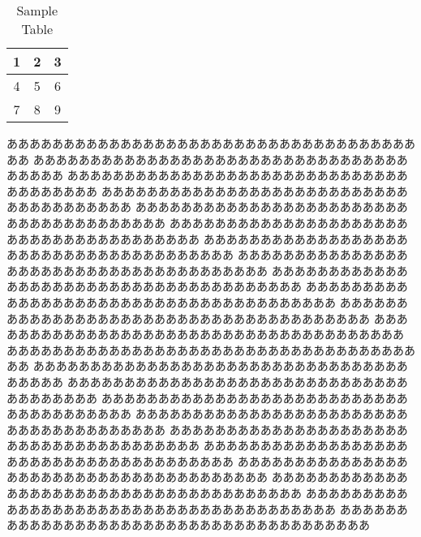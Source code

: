 \documentclass{classes/resume}
\begin{document}
\begin{table}[h]
    \centering
    \begin{tabular}{|c|c|c|}
        \hline
        1 & 2 & 3 \\
        \hline
        4 & 5 & 6 \\
        \hline
        7 & 8 & 9 \\
        \hline
    \end{tabular}
    \caption{Sample Table}
    \label{tab:sample}
\end{table}

ああああああああああああああああああああああああああああああああああああああ
ああああああああああああああああああああああああああああああああああああああ
ああああああああああああああああああああああああああああああああああああああ
ああああああああああああああああああああああああああああああああああああああ
ああああああああああああああああああああああああああああああああああああああ
ああああああああああああああああああああああああああああああああああああああ
ああああああああああああああああああああああああああああああああああああああ
ああああああああああああああああああああああああああああああああああああああ
ああああああああああああああああああああああああああああああああああああああ
ああああああああああああああああああああああああああああああああああああああ
ああああああああああああああああああああああああああああああああああああああ
ああああああああああああああああああああああああああああああああああああああ
ああああああああああああああああああああああああああああああああああああああ
ああああああああああああああああああああああああああああああああああああああ
ああああああああああああああああああああああああああああああああああああああ
ああああああああああああああああああああああああああああああああああああああ
ああああああああああああああああああああああああああああああああああああああ
ああああああああああああああああああああああああああああああああああああああ
ああああああああああああああああああああああああああああああああああああああ
ああああああああああああああああああああああああああああああああああああああ
ああああああああああああああああああああああああああああああああああああああ
ああああああああああああああああああああああああああああああああああああああ
ああああああああああああああああああああああああああああああああああああああ



\end{document}
